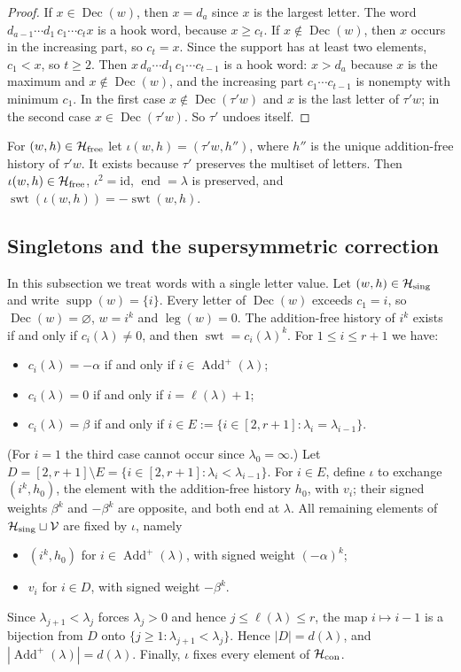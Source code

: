 \documentclass[11pt]{amsart}
\numberwithin{equation}{section}
\theoremstyle{definition}
\theoremstyle{remark}
\newcommand{\swt}{\operatorname{swt}}
\newcommand{\leg}{\operatorname{leg}}
\newcommand{\supp}{\operatorname{supp}}
\newcommand{\Dec}{\operatorname{Dec}}
\newcommand{\Add}{\operatorname{Add}}
\newcommand{\enD}{\operatorname{end}}
\newcommand{\cH}{\mathcal H}
\begin{document}
\begin{proof}
If $x\in\Dec(w)$, then $x=d_a$ since $x$ is the largest letter. The word
$d_{a-1}\cdots d_1\,c_1\cdots c_tx$ is a hook word, because $x\geq c_t$. If
$x\notin\Dec(w)$, then $x$ occurs in the increasing part, so $c_t=x$. Since
the support has at least two elements, $c_1<x$, so $t\geq2$. Then
$x\,d_a\cdots d_1\,c_1\cdots c_{t-1}$ is a hook word: $x>d_a$ because $x$ is
the maximum and $x\notin\Dec(w)$, and the increasing part $c_1\cdots c_{t-1}$
is nonempty with minimum $c_1$. In the first case $x\notin\Dec(\tau'w)$ and
$x$ is the last letter of $\tau'w$; in the second case $x\in\Dec(\tau'w)$.
So $\tau'$ undoes itself.
\end{proof}

For $(w,h)\in\cH_{\rm free}$ let $\iota(w,h)=(\tau'w,h'')$, where $h''$ is the
unique addition-free history of $\tau'w$. It exists because $\tau'$
preserves the multiset of letters. Then $\iota(w,h)\in\cH_{\rm free}$,
$\iota^2=\mathrm{id}$, $\enD=\lambda$ is preserved, and
$\swt(\iota(w,h))=-\swt(w,h)$.

\subsection{Singletons and the supersymmetric correction}

In this subsection we treat words with a single letter value. Let
$(w,h)\in\cH_{\rm sing}$ and write $\supp(w)=\{i\}$. Every letter of $\Dec(w)$
exceeds $c_1=i$, so $\Dec(w)=\varnothing$, $w=i^k$ and $\leg(w)=0$. The
addition-free history of $i^k$ exists if and only if $c_i(\lambda)\neq0$, and
then $\swt=c_i(\lambda)^k$. For $1\leq i\leq r+1$ we have:
\begin{itemize}
\item $c_i(\lambda)=-\alpha$ if and only if $i\in\Add^+(\lambda)$;
\item $c_i(\lambda)=0$ if and only if $i=\ell(\lambda)+1$;
\item $c_i(\lambda)=\beta$ if and only if $i\in E:=\{i\in[2,r+1]:\lambda_i=\lambda_{i-1}\}$.
\end{itemize}
(For $i=1$ the third case cannot occur since $\lambda_0=\infty$.) Let
$D=[2,r+1]\setminus E=\{i\in[2,r+1]:\lambda_i<\lambda_{i-1}\}$. For $i\in E$,
define $\iota$ to exchange $(i^k,h_0)$, the element with the addition-free
history $h_0$, with $v_i$; their signed weights $\beta^k$ and $-\beta^k$ are
opposite, and both end at $\lambda$. All remaining elements of
$\cH_{\rm sing}\sqcup\mathcal V$ are fixed by $\iota$, namely
\begin{itemize}
\item $(i^k,h_0)$ for $i\in\Add^+(\lambda)$, with signed weight $(-\alpha)^k$;
\item $v_i$ for $i\in D$, with signed weight $-\beta^k$.
\end{itemize}
Since $\lambda_{j+1}<\lambda_j$ forces $\lambda_j>0$ and hence
$j\leq\ell(\lambda)\leq r$, the map $i\mapsto i-1$ is a bijection from $D$
onto $\{j\geq1:\lambda_{j+1}<\lambda_j\}$. Hence $|D|=d(\lambda)$, and
$|\Add^+(\lambda)|=d(\lambda)$. Finally, $\iota$ fixes every element of $\cH_{\rm con}$.
\end{document}
